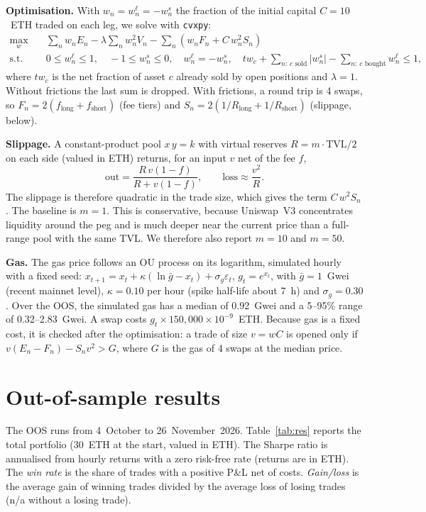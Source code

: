 \documentclass[10pt,a4paper]{article}
\begin{document}
\textbf{Optimisation.} With $w_n=w^{\ell}_n=-w^{s}_n$ the fraction of the initial
capital $C=10$~ETH traded on each leg, we solve with \texttt{cvxpy}:
\begin{align*}
\max_{w}\quad & \sum_n w_nE_n-\lambda\sum_n w_n^2V_n-\sum_n\left(w_nF_n+C\,w_n^2S_n\right)\\
\text{s.t.}\quad & 0\le w^{\ell}_n\le1,\quad -1\le w^{s}_n\le0,\quad w^{\ell}_n=-w^{s}_n,\quad
tw_c+\sum_{n:\,c\text{ sold}}|w^{s}_n|-\sum_{n:\,c\text{ bought}}w^{\ell}_n\le1,
\end{align*}
where $tw_c$ is the net fraction of asset $c$ already sold by open positions and
$\lambda=1$. Without frictions the last sum is dropped. With frictions, a round trip is
4 swaps, so $F_n=2(f_{\text{long}}+f_{\text{short}})$ (fee tiers) and
$S_n=2(1/R_{\text{long}}+1/R_{\text{short}})$ (slippage, below).

\textbf{Slippage.} A constant-product pool $x\,y=k$ with virtual reserves
$R=m\cdot\text{TVL}/2$ on each side (valued in ETH) returns, for an input $v$ net of
the fee $f$,
\[
\text{out}=\frac{R\,v(1-f)}{R+v(1-f)},\qquad
\text{loss}\approx\frac{v^2}{R}.
\]
The slippage is therefore quadratic in the trade size, which gives the term $C\,w^2S_n$.
The baseline is $m=1$. This is conservative, because Uniswap~V3 concentrates liquidity
around the peg and is much deeper near the current price than a full-range pool with the
same TVL. We therefore also report $m=10$ and $m=50$.

\textbf{Gas.} The gas price follows an OU process on its logarithm, simulated hourly
with a fixed seed:
$x_{t+1}=x_t+\kappa(\ln\bar g-x_t)+\sigma_g\varepsilon_t$, $g_t=e^{x_t}$, with
$\bar g=1$~Gwei (recent mainnet level), $\kappa=0.10$ per hour (spike half-life about
7~h) and $\sigma_g=0.30$. Over the OOS, the simulated gas has a median of 0.92~Gwei and a
5--95\% range of 0.32--2.83~Gwei. A swap costs $g_t\times150{,}000\times10^{-9}$~ETH.
Because gas is a fixed cost, it is checked after the optimisation: a trade of size
$v=wC$ is opened only if
$v(E_n-F_n)-S_nv^2>G$, where $G$ is the gas of 4 swaps at the median price.

\section{Out-of-sample results}

The OOS runs from 4~October to 26~November~2026. Table~\ref{tab:res} reports the
total portfolio (30~ETH at the start, valued in ETH). The Sharpe ratio is annualised
from hourly returns with a zero risk-free rate (returns are in ETH). The \emph{win rate}
is the share of trades with a positive P\&L net of costs. \emph{Gain/loss} is the average
gain of winning trades divided by the average loss of losing trades (n/a without a
losing trade).
\end{document}
